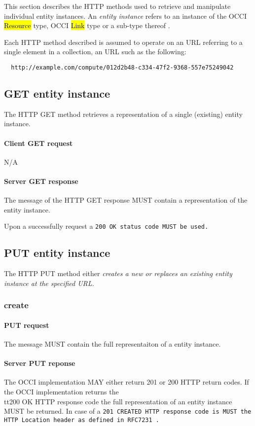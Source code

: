 \documentclass[10pt,a4paper]{article}
\begin{document}

This section describes the HTTP methods used to retrieve and manipulate
individual entity instances. An {\em entity instance} refers to an instance
of the OCCI \hl{Resource} type, OCCI \hl{Link} type or a sub-type thereof
\cite{occi:core}.

Each HTTP method described is assumed to operate
on an URL referring to a single element in a collection, an URL such as the
following:
\begin{verbatim}
  http://example.com/compute/012d2b48-c334-47f2-9368-557e75249042
\end{verbatim}

\subsection{GET entity instance}
The HTTP GET method retrieves a representation of a single (existing) entity instance.

\paragraph{Client GET request}
N/A

\paragraph{Server GET response}
The message of the HTTP GET response MUST contain a representation of the entity instance.

Upon a successfully request a \tt{200 OK} status code MUST be used.

\subsection{PUT entity instance}
The HTTP PUT method either \em{creates} a new or \em{replaces} an existing entity instance at the specified URL.

\subsubsection{create}

\paragraph{PUT request}
The message MUST contain the full representaiton of a entity instance.

\paragraph{Server PUT reponse}
The OCCI implementation MAY either return 201 or 200 HTTP return codes. If the OCCI implementation
returns the \\tt{200 OK} HTTP response code the full representation of an entity instance MUST be returned. 
In case of a \tt{201 CREATED} HTTP response code is MUST the HTTP Location header as defined in RFC7231 \cite{rfc7231}.
\end{document}
